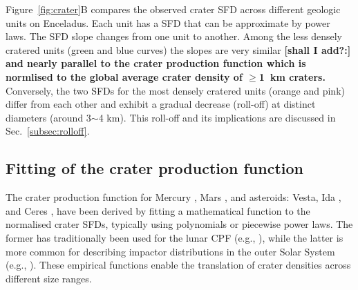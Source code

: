 \documentclass[preprint,11pt,3p,times,authoryear]{elsarticle}
\begin{document}
{Figure~\ref{fig:crater}B compares the observed crater SFD across different geologic units on Enceladus. Each unit has a SFD that can be approximate by power laws. The SFD slope changes from one unit to another. Among the less densely cratered units (green and blue curves) the slopes are very similar
\textbf{[shall I add?:] and nearly parallel to the crater production function which is normlised to the global average crater density of $\ge$1~km craters.}
Conversely, the two SFDs for the most densely cratered units (orange and pink) differ from each other and exhibit a gradual decrease (roll-off) at distinct diameters (around 3$\sim$4 km). This roll-off  and its implications are discussed in Sec.~\ref{subsec:rolloff}.\\



\subsection{Fitting of the crater production function}
\label{subsec:fitting}
The crater production function for Mercury \citep{Neukum2001}, Mars \citep{Ivanov2001, Hartmann2005}, and asteroids: Vesta, Ida \citep{Schmedemann2014}, and Ceres \citep{Hiesinger2016}, have been derived by fitting a mathematical function to the normalised crater SFDs, typically using polynomials or piecewise power laws. The former has traditionally been used for the lunar CPF (e.g., \citealt{Neukum2001}), while the latter is more common for describing impactor distributions in the outer Solar System (e.g., \citealt{Zahnle2003}). These empirical functions enable the translation of crater densities across different size ranges. \\

}
\end{document}
